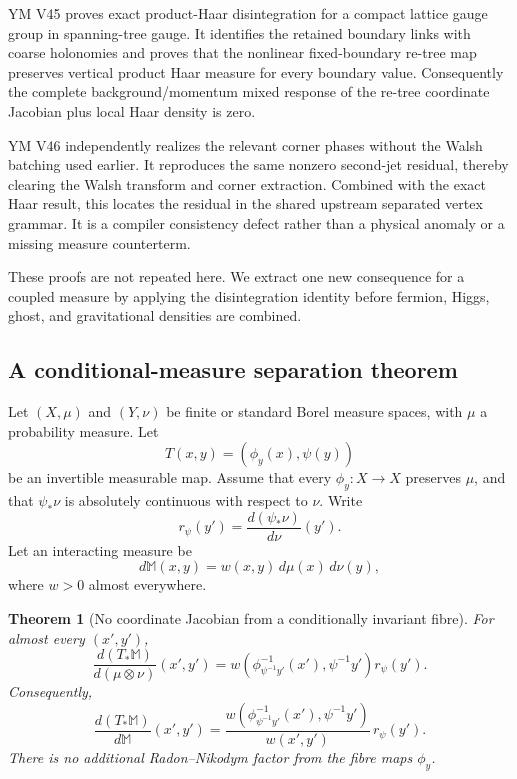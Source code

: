 \documentclass[11pt]{article}
\newtheorem{theorem}{Theorem}[section]
\theoremstyle{remark}
\begin{document}
YM V45 proves exact product-Haar disintegration for a compact lattice
gauge group in spanning-tree gauge.  It identifies the retained
boundary links with coarse holonomies and proves that the nonlinear
fixed-boundary re-tree map preserves vertical product Haar measure
for every boundary value.  Consequently the complete
background/momentum mixed response of the re-tree coordinate
Jacobian plus local Haar density is zero.

YM V46 independently realizes the relevant corner phases without
the Walsh batching used earlier.  It reproduces the same nonzero
second-jet residual, thereby clearing the Walsh transform and corner
extraction.  Combined with the exact Haar result, this locates the
residual in the shared upstream separated vertex grammar.  It is a
compiler consistency defect rather than a physical anomaly or a
missing measure counterterm.

These proofs are not repeated here.  We extract one new consequence
for a coupled measure by applying the disintegration identity before
fermion, Higgs, ghost, and gravitational densities are combined.

\subsection{A conditional-measure separation theorem}

Let \((X,\mu)\) and \((Y,\nu)\) be finite or standard Borel measure
spaces, with \(\mu\) a probability measure.  Let
\[
 T(x,y)=(\phi_y(x),\psi(y))                                 \tag{15.2}
\]
be an invertible measurable map.  Assume that every
\(\phi_y:X\to X\) preserves \(\mu\), and that \(\psi_*\nu\) is
absolutely continuous with respect to \(\nu\).  Write
\[
 r_\psi(y')=\frac{d(\psi_*\nu)}{d\nu}(y').                  \tag{15.3}
\]
Let an interacting measure be
\[
                         d{\mathbb M}(x,y)
 =w(x,y)\,d\mu(x)\,d\nu(y),                                \tag{15.4}
\]
where \(w>0\) almost everywhere.

\begin{theorem}[No coordinate Jacobian from a conditionally
invariant fibre]
\label{thm:v12v15-disintegration}
For almost every \((x',y')\),
\[
 \frac{d(T_*{\mathbb M})}{d(\mu\otimes\nu)}(x',y')
 =
 w\!\left(
 \phi_{\psi^{-1}y'}^{-1}(x'),\psi^{-1}y'
 \right)r_\psi(y').                                        \tag{15.5}
\]
Consequently,
\[
 \boxed{
 \frac{d(T_*{\mathbb M})}{d{\mathbb M}}(x',y')
 =
 \frac{
 w\!\left(\phi_{\psi^{-1}y'}^{-1}(x'),\psi^{-1}y'\right)}
 {w(x',y')}\,r_\psi(y').}                                  \tag{15.6}
\]
There is no additional Radon--Nikodym factor from the fibre maps
\(\phi_y\).
\end{theorem}
\end{document}
